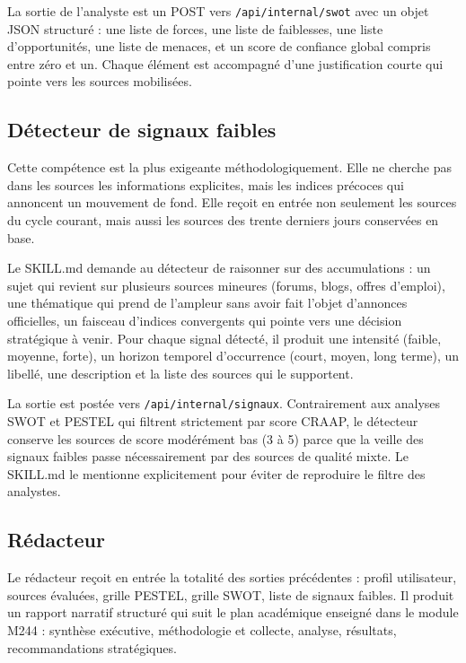 \documentclass[12pt,a4paper,openany]{report}
\begin{document}
La sortie de l'analyste est un POST vers \texttt{/api/internal/swot} avec un objet JSON structuré : une liste de forces, une liste de faiblesses, une liste d'opportunités, une liste de menaces, et un score de confiance global compris entre zéro et un. Chaque élément est accompagné d'une justification courte qui pointe vers les sources mobilisées.

\subsection{Détecteur de signaux faibles}
\label{sec:skill-signaux}

Cette compétence est la plus exigeante méthodologiquement. Elle ne cherche pas dans les sources les informations explicites, mais les indices précoces qui annoncent un mouvement de fond. Elle reçoit en entrée non seulement les sources du cycle courant, mais aussi les sources des trente derniers jours conservées en base.

Le SKILL.md demande au détecteur de raisonner sur des accumulations : un sujet qui revient sur plusieurs sources mineures (forums, blogs, offres d'emploi), une thématique qui prend de l'ampleur sans avoir fait l'objet d'annonces officielles, un faisceau d'indices convergents qui pointe vers une décision stratégique à venir. Pour chaque signal détecté, il produit une intensité (faible, moyenne, forte), un horizon temporel d'occurrence (court, moyen, long terme), un libellé, une description et la liste des sources qui le supportent.

La sortie est postée vers \texttt{/api/internal/signaux}. Contrairement aux analyses SWOT et PESTEL qui filtrent strictement par score CRAAP, le détecteur conserve les sources de score modérément bas (3 à 5) parce que la veille des signaux faibles passe nécessairement par des sources de qualité mixte. Le SKILL.md le mentionne explicitement pour éviter de reproduire le filtre des analystes.

\subsection{Rédacteur}
\label{sec:skill-redacteur}

Le rédacteur reçoit en entrée la totalité des sorties précédentes : profil utilisateur, sources évaluées, grille PESTEL, grille SWOT, liste de signaux faibles. Il produit un rapport narratif structuré qui suit le plan académique enseigné dans le module M244 : synthèse exécutive, méthodologie et collecte, analyse, résultats, recommandations stratégiques.
\end{document}
